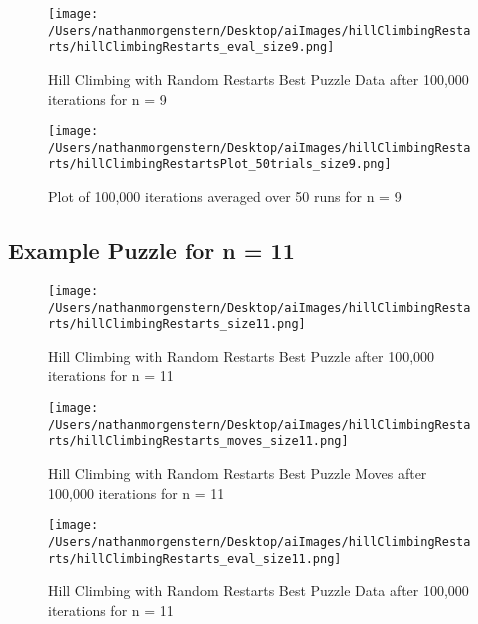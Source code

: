 \documentclass{report}
\begin{document}
	\begin{figure}[H]
	\centering
	\texttt{[image: /Users/nathanmorgenstern/Desktop/aiImages/hillClimbingRestarts/hillClimbingRestarts\_eval\_size9.png]}
	\caption{Hill Climbing with Random Restarts Best Puzzle Data after 100,000 iterations for n = 9} 
	\label{fig: Hill Climbing with Random Restarts Best Puzzle Data after 100,000 iterations for n = 9}
	\end{figure}

	\begin{figure}[H]
	\centering
	\texttt{[image: /Users/nathanmorgenstern/Desktop/aiImages/hillClimbingRestarts/hillClimbingRestartsPlot\_50trials\_size9.png]}
	\caption{Plot of 100,000 iterations averaged over 50 runs for n = 9}
	\label{fig: Plot of 100,000 iterations averaged over 50 runs for n = 9}
	\end{figure}
	
\subsection{Example Puzzle for n = 11}

	\begin{figure}[H]
	\centering
	\texttt{[image: /Users/nathanmorgenstern/Desktop/aiImages/hillClimbingRestarts/hillClimbingRestarts\_size11.png]}
	\caption{Hill Climbing with Random Restarts Best Puzzle after 100,000 iterations for n = 11} 
	\label{fig: Hill Climbing with Random Restarts Best Puzzle after 100,000 iterations for n = 11}
	\end{figure}
	
	\begin{figure}[H]
	\centering
	\texttt{[image: /Users/nathanmorgenstern/Desktop/aiImages/hillClimbingRestarts/hillClimbingRestarts\_moves\_size11.png]}
	\caption{Hill Climbing with Random Restarts Best Puzzle Moves after 100,000 iterations for n = 11} 
	\label{fig: Hill Climbing with Random Restarts Best Puzzle Moves after 100,000 iterations for n = 11}
	\end{figure}

	\begin{figure}[H]
	\centering
	\texttt{[image: /Users/nathanmorgenstern/Desktop/aiImages/hillClimbingRestarts/hillClimbingRestarts\_eval\_size11.png]}
	\caption{Hill Climbing with Random Restarts Best Puzzle Data after 100,000 iterations for n = 11} 
	\label{fig: Hill Climbing with Random Restarts Best Puzzle Data after 100,000 iterations for n = 11}
	\end{figure}
\end{document}
